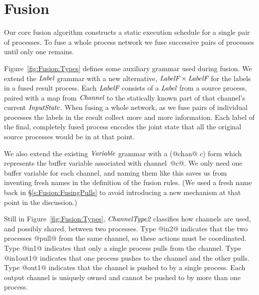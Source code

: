 
\section{Fusion}
\label{s:Fusion}

Our core fusion algorithm constructs a static execution schedule for a single pair of processes. To fuse a whole process network we fuse successive pairs of processes until only one remains. 

Figure~\ref{fig:Fusion:Types} defines some auxiliary grammar used during fusion. We extend the $\textit{Label}$ grammar with a new alternative, $\textit{LabelF} \times \textit{LabelF}$ for the labels in a fused result process. Each $\textit{LabelF}$ consists of a $\textit{Label}$ from a source process, paired with a map from $\textit{Channel}$ to the statically known part of that channel's current $\textit{InputState}$. When fusing a whole network, as we fuse pairs of individual processes the labels in the result collect more and more information. Each label of the final, completely fused process encodes the joint state that all the original source processes would be in at that point.



We also extend the existing $\textit{Variable}$ grammar with a (@chan@ $c$) form which represents the buffer variable associated with \mbox{channel @c@}. We only need one buffer variable for each channel, and naming them like this saves us from inventing fresh names in the definition of the fusion rules.
(We used a fresh name back in \S\ref{s:Fusion:FusingPulls} to avoid introducing a new mechanism at that point in the discussion.) 

Still in Figure~\ref{fig:Fusion:Types}, $\textit{ChannelType2}$ classifies how channels are used, and possibly shared, between two processes. Type @in2@ indicates that the two processes @pull@ from the same channel, so these actions must be coordinated. Type @in1@ indicates that only a single process pulls from the channel. Type @in1out1@ indicates that one process pushes to the channel and the other pulls. Type @out1@ indicates that the channel is pushed to by a single process. Each output channel is uniquely owned and cannot be pushed to by more than one process.

